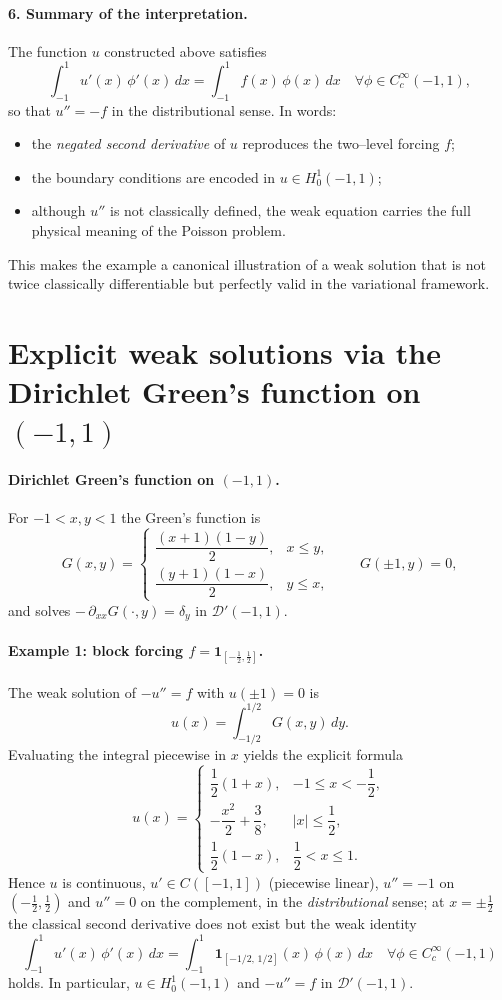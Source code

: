 \documentclass[12pt,a4paper]{article}
\theoremstyle{plain}
\theoremstyle{definition}
\theoremstyle{remark}
\theoremstyle{remark}
\begin{document}
\bigskip

\paragraph{6. Summary of the interpretation.}
The function $u$ constructed above satisfies
\[
\int_{-1}^{1} u'(x)\,\phi'(x)\,dx = \int_{-1}^{1} f(x)\,\phi(x)\,dx
\quad \forall \phi\in C_c^\infty(-1,1),
\]
so that $u''=-f$ in the distributional sense.
In words:
\begin{itemize}
	\item the \emph{negated second derivative} of $u$ reproduces the two--level forcing $f$;
	\item the boundary conditions are encoded in $u\in H_0^1(-1,1)$;
	\item although $u''$ is not classically defined, the weak equation carries the full physical meaning of the Poisson problem.
\end{itemize}
This makes the example a canonical illustration of a weak solution that is not twice classically differentiable but perfectly valid in the variational framework.

\section*{Explicit weak solutions via the Dirichlet Green's function on $(-1,1)$}

\paragraph{Dirichlet Green's function on $(-1,1)$.}
For $-1<x,y<1$ the Green's function is
\[
G(x,y)=
\begin{cases}
	\dfrac{(x+1)(1-y)}{2}, & x\le y,\\[6pt]
	\dfrac{(y+1)(1-x)}{2}, & y\le x,
\end{cases}
\qquad
G(\pm1,y)=0,
\]
and solves $-\,\partial_{xx}G(\cdot,y)=\delta_y$ in $\mathcal D'(-1,1)$.

\bigskip

\paragraph{Example 1: block forcing $f=\mathbf 1_{[-\frac12,\frac12]}$.}
The weak solution of $-u''=f$ with $u(\pm1)=0$ is
\[
u(x)=\int_{-1/2}^{1/2} G(x,y)\,dy .
\]
Evaluating the integral piecewise in $x$ yields the explicit formula
\[
u(x)=
\begin{cases}
	\dfrac{1}{2}(1+x), & -1\le x<-\dfrac12,\\[8pt]
	-\dfrac{x^2}{2}+\dfrac{3}{8}, & |x|\le\dfrac12,\\[8pt]
	\dfrac{1}{2}(1-x), & \dfrac12<x\le 1.
\end{cases}
\]
Hence $u$ is continuous, $u'\in C([-1,1])$ (piecewise linear), $u''=-1$ on $(-\tfrac12,\tfrac12)$ and
$u''=0$ on the complement, in the \emph{distributional} sense; at $x=\pm\frac12$ the classical second derivative
does not exist but the weak identity
\[
\int_{-1}^1 u'(x)\,\phi'(x)\,dx = \int_{-1}^1 \mathbf 1_{[-1/2,\,1/2]}(x)\,\phi(x)\,dx
\quad\forall \phi\in C_c^\infty(-1,1)
\]
holds. In particular, $u\in H_0^1(-1,1)$ and $-u''=f$ in $\mathcal D'(-1,1)$.
\end{document}

